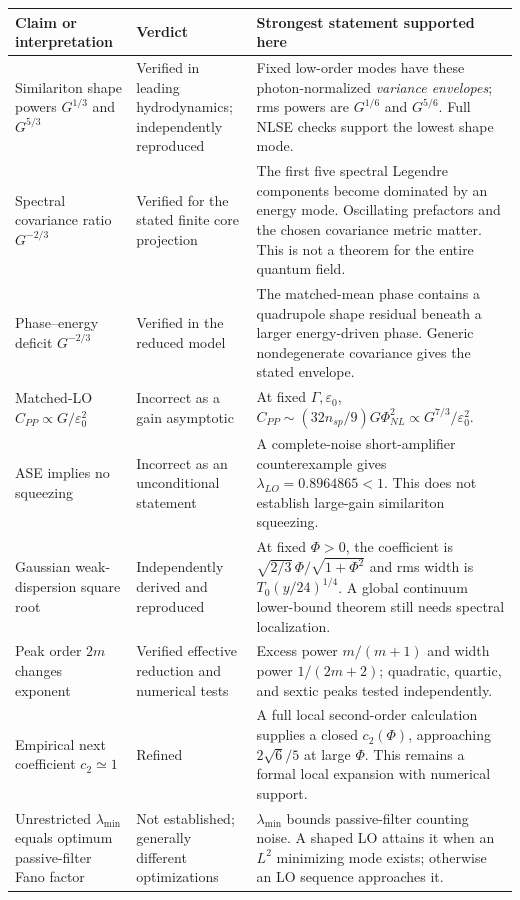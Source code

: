 \documentclass[11pt,a4paper]{article}
\newcommand{\eps}{\varepsilon}
\begin{document}
\begin{longtable}{@{}p{}p{}p{}@{}}
\toprule
Claim or interpretation & Verdict & Strongest statement supported here \\
\midrule\endhead
Similariton shape powers $G^{1/3}$ and $G^{5/3}$ & Verified in leading hydrodynamics; independently reproduced & Fixed low-order modes have these photon-normalized \emph{variance envelopes}; rms powers are $G^{1/6}$ and $G^{5/6}$. Full NLSE checks support the lowest shape mode. \\
Spectral covariance ratio $G^{-2/3}$ & Verified for the stated finite core projection & The first five spectral Legendre components become dominated by an energy mode. Oscillating prefactors and the chosen covariance metric matter. This is not a theorem for the entire quantum field. \\
Phase--energy deficit $G^{-2/3}$ & Verified in the reduced model & The matched-mean phase contains a quadrupole shape residual beneath a larger energy-driven phase. Generic nondegenerate covariance gives the stated envelope. \\
Matched-LO $C_{PP}\propto G/\eps_0^2$ & Incorrect as a gain asymptotic & At fixed $\Gamma,\eps_0$, $C_{PP}\sim(32n_{sp}/9)G\Phi_{NL}^{2}\propto G^{7/3}/\eps_0^2$. \\
ASE implies no squeezing & Incorrect as an unconditional statement & A complete-noise short-amplifier counterexample gives $\lambda_{LO}=0.8964865<1$. This does not establish large-gain similariton squeezing. \\
Gaussian weak-dispersion square root & Independently derived and reproduced & At fixed $\Phi>0$, the coefficient is $\sqrt{2/3}\,\Phi/\sqrt{1+\Phi^2}$ and rms width is $T_0(y/24)^{1/4}$. A global continuum lower-bound theorem still needs spectral localization. \\
Peak order $2m$ changes exponent & Verified effective reduction and numerical tests & Excess power $m/(m+1)$ and width power $1/(2m+2)$; quadratic, quartic, and sextic peaks tested independently. \\
Empirical next coefficient $c_2\simeq1$ & Refined & A full local second-order calculation supplies a closed $c_2(\Phi)$, approaching $2\sqrt6/5$ at large $\Phi$. This remains a formal local expansion with numerical support. \\
Unrestricted $\lambda_{\min}$ equals optimum passive-filter Fano factor & Not established; generally different optimizations & $\lambda_{\min}$ bounds passive-filter counting noise. A shaped LO attains it when an $L^2$ minimizing mode exists; otherwise an LO sequence approaches it. \\

\end{longtable}
\end{document}
